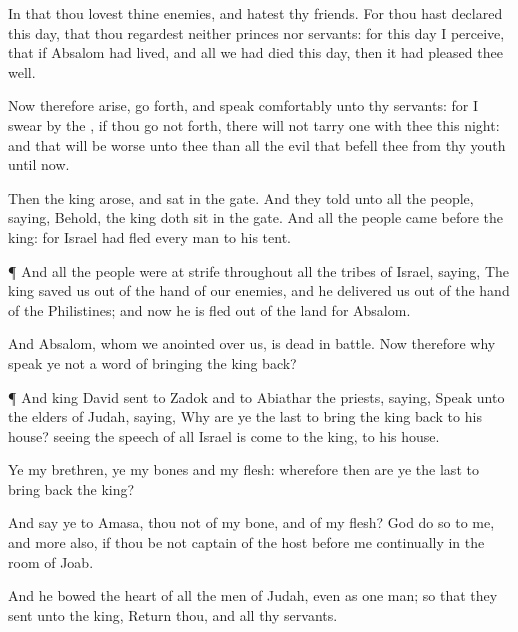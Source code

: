 {In that thou
lovest thine
enemies, and
hatest thy
friends. For thou hast
declared this
day, that thou regardest neither
princes nor
servants: for this
day I
perceive, that
if
Absalom had
lived, and all we had
died this
day, then it had pleased thee
well.

Now therefore
arise, go
forth, and
speak
comfortably unto thy
servants: for I
swear by the
{}, if thou go not
forth, there will not
tarry
one with thee this
night: and that will be
worse unto thee than all the
evil that
befell thee from thy
youth until now.

Then the
king
arose, and
sat in the
gate. And they
told unto all the
people,
saying, Behold, the
king doth
sit in the
gate. And all the
people
came
before the
king: for
Israel had
fled every
man to his
tent.


\par }{\PP {}¶ And all the
people were at
strife throughout all the
tribes of
Israel,
saying, The
king
saved us out of the
hand of our
enemies, and he
delivered us out of the
hand of the
Philistines; and now he is
fled out of the
land for
Absalom.

And
Absalom, whom we
anointed over us, is
dead in
battle. Now therefore why
speak ye not a word of
bringing the
king
back?


\par }{\PP {}¶ And
king
David
sent to
Zadok and to
Abiathar the
priests,
saying,
Speak unto the
elders of
Judah,
saying, Why are ye the
last to
bring the
king
back to his
house? seeing the
speech of all
Israel is
come to the
king,
{} to his
house.

Ye
{} my
brethren, ye
{} my
bones and my
flesh: wherefore then are ye the
last to bring
back the
king?

And
say ye to
Amasa,
{} thou not of my
bone, and of my
flesh?
God
do so to me, and
more also, if thou be not
captain of the
host
before me
continually in the
room of
Joab.

And he
bowed the
heart of all the
men of
Judah, even as
{}
one
man; so that they
sent
{} unto the
king,
Return thou, and all thy
servants.

}
